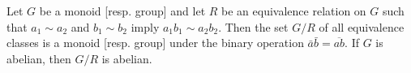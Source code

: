 \begin{theorem}
Let $G$ be a monoid [resp. group] and let $R$ be an equivalence relation on $G$ such that $a_1 \sim a_2$ and $b_1 \sim b_2$ imply $a_1 b_1 \sim a_2 b_2$. Then the set $G/R$ of all equivalence classes is a monoid [resp. group] under the binary operation $\bar{a}\bar{b} = \overline{ab}$. If $G$ is abelian, then $G/R$ is abelian.
\end{theorem}
